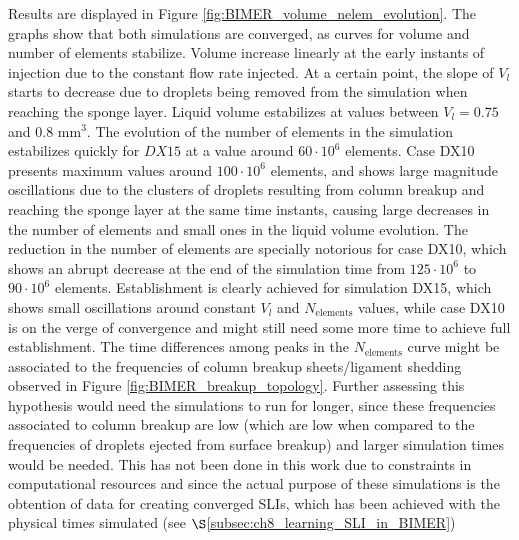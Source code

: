 Results are displayed in Figure \ref{fig:BIMER_volume_nelem_evolution}. The graphs show that both simulations are converged, as curves for volume and number of elements stabilize. Volume increase linearly at the early instants of injection due to the constant flow rate injected. At a certain point, the slope of $V_l$ starts to decrease due to droplets being removed from the simulation when reaching the sponge layer. Liquid volume estabilizes at values between $V_l = 0.75$ and $0.8$ mm$^3$. The evolution of the number of elements in the simulation estabilizes quickly for $DX15$ at a value around $60 \cdot 10^6$ elements. Case DX10 presents maximum values around $100 \cdot 10^6$ elements, and shows large magnitude oscillations due to the clusters of droplets resulting from column breakup and reaching the sponge layer at the same time instants, causing large decreases in the number of elements and small ones in the liquid volume evolution. The reduction in the number of elements are specially notorious for case DX10, which shows an abrupt decrease at the end of the simulation time from $125 \cdot 10^6$ to $90 \cdot 10^6$ elements. Establishment is clearly achieved for simulation DX15, which shows small oscillations around constant $V_l$ and $N_\mathrm{elements}$ values, while case DX10 is on the verge of convergence and might still need some more time to achieve full establishment. The time differences among peaks in the $N_\mathrm{elements}$ curve might be associated to the frequencies of column breakup sheets/ligament shedding observed in Figure \ref{fig:BIMER_breakup_topology}. Further assessing this hypothesis would need the simulations to run for longer, since these frequencies associated to column breakup are low (which are low when compared to the frequencies of droplets ejected from surface breakup) and larger simulation times would be needed. This has not been done in this work due to constraints in computational resources and since the actual purpose of these simulations is the obtention of data for creating converged SLIs, which has been achieved with the physical times simulated (see $\S$\ref{subsec:ch8_learning_SLI_in_BIMER})



